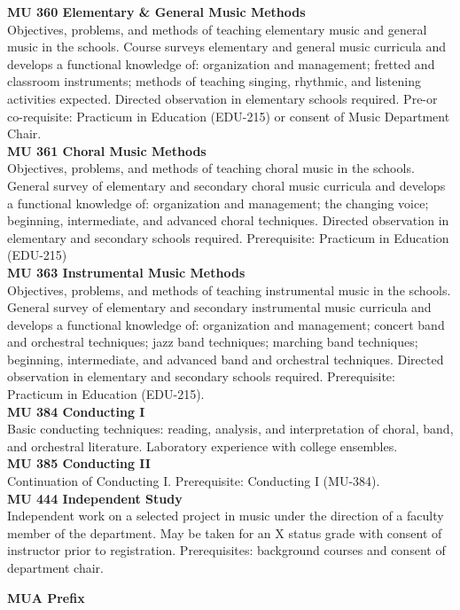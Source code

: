 \documentclass[
  letterpaper,
]{scrbook}
\begin{document}
\textbf{MU 360 Elementary \& General Music Methods}\\
Objectives, problems, and methods of teaching elementary music and
general music in the schools. Course surveys elementary and general
music curricula and develops a functional knowledge of: organization and
management; fretted and classroom instruments; methods of teaching
singing, rhythmic, and listening activities expected. Directed
observation in elementary schools required. Pre-or co-requisite:
Practicum in Education (EDU-215) or consent of Music Department Chair.\\
\textbf{MU 361 Choral Music Methods}\\
Objectives, problems, and methods of teaching choral music in the
schools. General survey of elementary and secondary choral music
curricula and develops a functional knowledge of: organization and
management; the changing voice; beginning, intermediate, and advanced
choral techniques. Directed observation in elementary and secondary
schools required. Prerequisite: Practicum in Education (EDU-215)\\
\textbf{MU 363 Instrumental Music Methods}\\
Objectives, problems, and methods of teaching instrumental music in the
schools. General survey of elementary and secondary instrumental music
curricula and develops a functional knowledge of: organization and
management; concert band and orchestral techniques; jazz band
techniques; marching band techniques; beginning, intermediate, and
advanced band and orchestral techniques. Directed observation in
elementary and secondary schools required. Prerequisite: Practicum in
Education (EDU-215).\\
\textbf{MU 384 Conducting I}\\
Basic conducting techniques: reading, analysis, and interpretation of
choral, band, and orchestral literature. Laboratory experience with
college ensembles.\\
\textbf{MU 385 Conducting II}\\
Continuation of Conducting I. Prerequisite: Conducting I (MU-384).\\
\textbf{MU 444 Independent Study}\\
Independent work on a selected project in music under the direction of a
faculty member of the department. May be taken for an X status grade
with consent of instructor prior to registration. Prerequisites:
background courses and consent of department chair.

\textbf{MUA Prefix}
\end{document}
